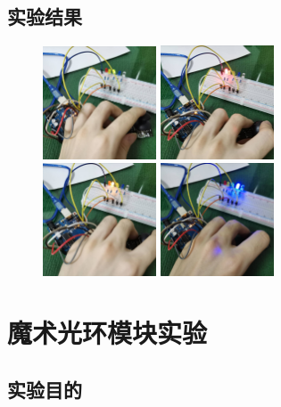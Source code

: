 \documentclass[UTF8, oneside]{ctexbook}
\begin{document}
\section{实验结果}
\begin{figure}[h]
    \centering
    \includegraphics[width=0.3\textwidth]{./result/sensor/4/result1.jpg}
    \includegraphics[width=0.3\textwidth]{./result/sensor/4/result2.jpg}\\
    \includegraphics[width=0.3\textwidth]{./result/sensor/4/result3.jpg}
    \includegraphics[width=0.3\textwidth]{./result/sensor/4/result4.jpg}
\end{figure}


\chapter{魔术光环模块实验}

\section{实验目的}
\end{document}
